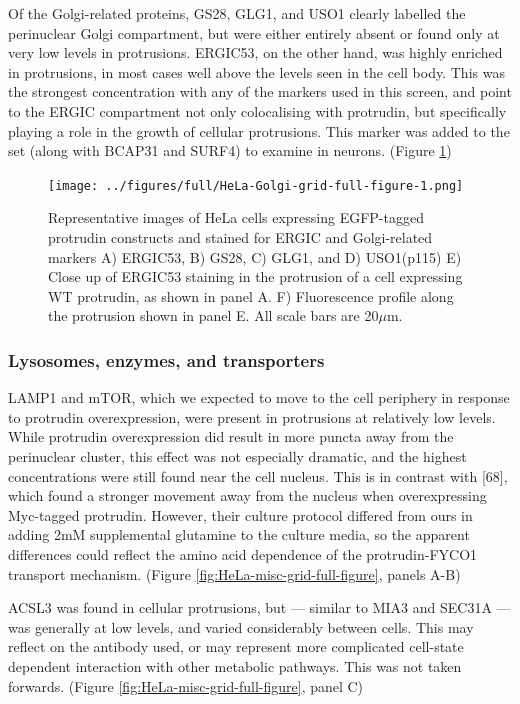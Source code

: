 \documentclass[
  12pt,
  a4paper,
]{book}
\begin{document}
Of the Golgi-related proteins, GS28, GLG1, and USO1 clearly labelled the perinuclear Golgi compartment, but were either entirely absent or found only at very low levels in protrusions. ERGIC53, on the other hand, was highly enriched in protrusions, in most cases well above the levels seen in the cell body. This was the strongest concentration with any of the markers used in this screen, and point to the ERGIC compartment not only colocalising with protrudin, but specifically playing a role in the growth of cellular protrusions. This marker was added to the set (along with BCAP31 and SURF4) to examine in neurons. (Figure \ref{fig:HeLa-Golgi-grid-full-figure})

\begin{figure}
\centering
\texttt{[image: ../figures/full/HeLa-Golgi-grid-full-figure-1.png]}
\caption{\label{fig:HeLa-Golgi-grid-full-figure}Representative images of HeLa cells expressing EGFP-tagged protrudin constructs and stained for ERGIC and Golgi-related markers A) ERGIC53, B) GS28, C) GLG1, and D) USO1(p115) E) Close up of ERGIC53 staining in the protrusion of a cell expressing WT protrudin, as shown in panel A. F) Fluorescence profile along the protrusion shown in panel E. All scale bars are 20\(\mu\)m.}
\end{figure}

\hypertarget{lysosomes-enzymes-and-transporters}{%
\subsubsection{Lysosomes, enzymes, and transporters}\label{lysosomes-enzymes-and-transporters}}

LAMP1 and mTOR, which we expected to move to the cell periphery in response to protrudin overexpression, were present in protrusions at relatively low levels. While protrudin overexpression did result in more puncta away from the perinuclear cluster, this effect was not especially dramatic, and the highest concentrations were still found near the cell nucleus. This is in contrast with {[}68{]}, which found a stronger movement away from the nucleus when overexpressing Myc-tagged protrudin. However, their culture protocol differed from ours in adding 2mM supplemental glutamine to the culture media, so the apparent differences could reflect the amino acid dependence of the protrudin-FYCO1 transport mechanism. (Figure \ref{fig:HeLa-misc-grid-full-figure}, panels A-B)

ACSL3 was found in cellular protrusions, but --- similar to MIA3 and SEC31A --- was generally at low levels, and varied considerably between cells. This may reflect on the antibody used, or may represent more complicated cell-state dependent interaction with other metabolic pathways. This was not taken forwards. (Figure \ref{fig:HeLa-misc-grid-full-figure}, panel C)
\end{document}
